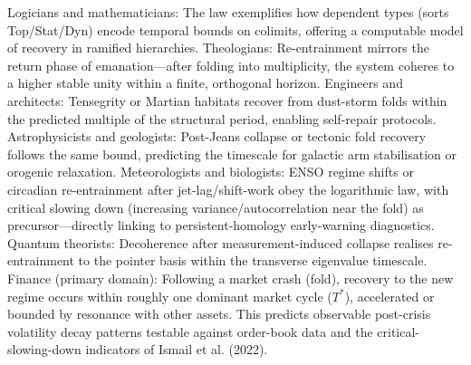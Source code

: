 Logicians and mathematicians: The law exemplifies how dependent types (sorts Top/Stat/Dyn) encode temporal bounds on colimits, offering a computable model of recovery in ramified hierarchies.
Theologians: Re-entrainment mirrors the return phase of emanation—after folding into multiplicity, the system coheres to a higher stable unity within a finite, orthogonal horizon.
Engineers and architects: Tensegrity or Martian habitats recover from dust-storm folds within the predicted multiple of the structural period, enabling self-repair protocols.
Astrophysicists and geologists: Post-Jeans collapse or tectonic fold recovery follows the same bound, predicting the timescale for galactic arm stabilisation or orogenic relaxation.
Meteorologists and biologists: ENSO regime shifts or circadian re-entrainment after jet-lag/shift-work obey the logarithmic law, with critical slowing down (increasing variance/autocorrelation near the fold) as precursor—directly linking to persistent-homology early-warning diagnostics.
Quantum theorists: Decoherence after measurement-induced collapse realises re-entrainment to the pointer basis within the transverse eigenvalue timescale.
Finance (primary domain): Following a market crash (fold), recovery to the new regime occurs within roughly one dominant market cycle ($  T^*  $), accelerated or bounded by resonance with other assets. This predicts observable post-crisis volatility decay patterns testable against order-book data and the critical-slowing-down indicators of Ismail et al. (2022).

